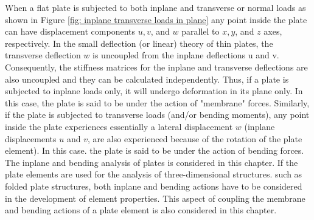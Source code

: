 
When a flat plate is subjected to both inplane and transverse or normal loads as shown
in Figure \ref{fig: inplane transverse loads in plane} any point inside the plate can have displacement components $ u, v $, and
$ w $ parallel to $ x, y $, and $ z $ axes, respectively. In the small deflection (or linear) theory of thin plates, the transverse deflection $ w $ is uncoupled from the inplane deflections u and v. Consequently, the stiffness matrices for the inplane and transverse deflections are also uncoupled and they can be calculated independently. Thus, if a plate is subjected to inplane loads only, it will undergo deformation in its plane only. In this case, the plate is said to be under the action of "membrane" forces. Similarly, if the plate is subjected to transverse loads (and/or bending moments), any point inside the plate experiences
essentially a lateral displacement $ w $ (inplane displacements $ u $ and $ v $, are also experienced because of the rotation of the plate element). In this case. the plate is said to be under the action of bending forces. The inplane and bending analysis of plates is considered in this chapter. If the plate elements are used for the analysis of three-dimensional structures. such as folded plate structures, both inplane and bending actions have to be considered in the development of element properties. This aspect of coupling the membrane and bending actions of a plate element is also considered in this chapter.

